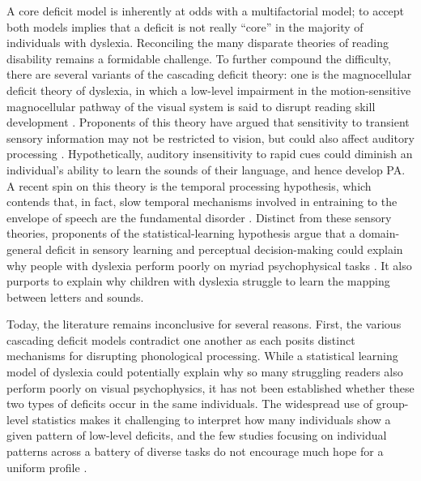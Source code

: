 \documentclass[../uwthesis.tex]{subfiles}
\begin{document}
A core deficit model is inherently at odds with a multifactorial model; to accept both models implies that a deficit is not really “core” in the majority of individuals with dyslexia. Reconciling the many disparate theories of reading disability remains a formidable challenge. To further compound the difficulty, there are several variants of the cascading deficit theory: one is the magnocellular deficit theory of dyslexia, in which a low-level impairment in the motion-sensitive magnocellular pathway of the visual system is said to disrupt reading skill development \citep{Stein2001TheDyslexia,Stein2018TheDyslexia,Stein1997ToDyslexia}. Proponents of this theory have argued that sensitivity to transient sensory information may not be restricted to vision, but could also affect auditory processing 
\citep{Stein1999ImpairedHypothesis,VanIngelghem2001,Witton1998}. Hypothetically, auditory insensitivity to rapid cues could diminish an individual’s ability to learn the sounds of their language, and hence develop PA. A recent spin on this theory is the temporal processing hypothesis, which contends that, in fact, slow temporal mechanisms involved in entraining to the envelope of speech are the fundamental disorder \citep{Casini2018ItsDyslexia,Goswami2015SensoryResearch,Huss2011}. Distinct from these sensory theories, proponents of the statistical-learning hypothesis argue that a domain-general deficit in sensory learning and perceptual decision-making could explain why people with dyslexia perform poorly on myriad psychophysical tasks  \citep{Ahissar2007,Nicolson2018ProceduralCommitment,Ziegler2008}. It also purports to explain why children with dyslexia struggle to learn the mapping between letters and sounds.

Today, the literature remains inconclusive for several reasons. First, the various cascading deficit models contradict one another as each posits distinct mechanisms for disrupting phonological processing. While a statistical learning model of dyslexia could potentially explain why so many struggling readers also perform poorly on visual psychophysics, it has not been established whether these two types of deficits occur in the same individuals. The widespread use of group-level statistics makes it challenging to interpret how many individuals show a given pattern of low-level deficits, and the few studies focusing on individual patterns across a battery of diverse tasks do not encourage much hope for a uniform profile \citep{Amitay2002,Ho2002TheDyslexia.,Menghini2010DevelopmentalMemory.,Ramus2003,White2006}.
\end{document}
